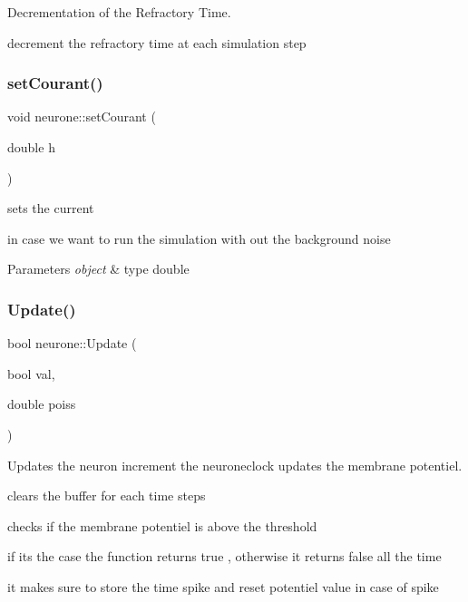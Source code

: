 Decrementation of the Refractory Time. 

decrement the refractory time at each simulation step \mbox{\label{classneurone_aee16c91befdb31b71067f7e800053d46}} 
\subsubsection{\texorpdfstring{set\+Courant()}{setCourant()}}
{\footnotesize\ttfamily void neurone\+::set\+Courant (\begin{DoxyParamCaption}\item[{double}]{h }\end{DoxyParamCaption})}



sets the current 

in case we want to run the simulation with out the background noise


\begin{DoxyParams}{Parameters}
{\em object} & type double \\
\hline
\end{DoxyParams}
\mbox{\label{classneurone_a0d86742f8c3cb66b6e223f5588dd84de}} 
\subsubsection{\texorpdfstring{Update()}{Update()}}
{\footnotesize\ttfamily bool neurone\+::\+Update (\begin{DoxyParamCaption}\item[{bool}]{val,  }\item[{double}]{poiss }\end{DoxyParamCaption})}



Updates the neuron increment the neuroneclock updates the membrane potentiel. 

clears the buffer for each time steps

checks if the membrane potentiel is above the threshold

if it\textquotesingle{}s the case the function returns true , otherwise it returns false all the time

it makes sure to store the time spike and reset potentiel value in case of spike

